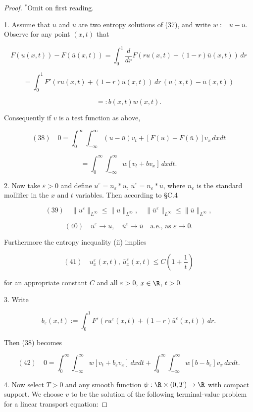 \begin{proof}
$^*$Omit on first reading.

1. Assume that $u$ and $\bar{u}$ are two entropy solutions of (37), and write $w := u - \bar{u}$. Observe for any point $(x,t)$ that

$$F(u(x,t)) - F(\bar{u}(x,t)) = \int_0^1 \frac{d}{dr} F(ru(x,t) + (1-r)\bar{u}(x,t)) \, dr$$

$$= \int_0^1 F'(ru(x,t) + (1-r)\bar{u}(x,t)) \, dr \, (u(x,t) - \bar{u}(x,t))$$

$$=: b(x,t)w(x,t).$$

Consequently if $v$ is a test function as above,

$$(38) \quad 0 = \int_0^\infty \int_{-\infty}^\infty (u - \bar{u})v_t + [F(u) - F(\bar{u})]v_x \, dx dt$$

$$= \int_0^\infty \int_{-\infty}^\infty w[v_t + bv_x] \, dx dt.$$

2. Now take $\varepsilon > 0$ and define $u^\varepsilon = n_\varepsilon * u$, $\bar{u}^\varepsilon = n_\varepsilon * \bar{u}$, where $n_\varepsilon$ is the standard mollifier in the $x$ and $t$ variables. Then according to \S C.4

$$(39) \quad \|u^\varepsilon\|_{L^\infty} \leq \|u\|_{L^\infty}, \quad \|\bar{u}^\varepsilon\|_{L^\infty} \leq \|\bar{u}\|_{L^\infty},$$

$$(40) \quad u^\varepsilon \to u, \quad \bar{u}^\varepsilon \to \bar{u} \quad \text{a.e., as } \varepsilon \to 0.$$

Furthermore the entropy inequality (ii) implies

$$(41) \quad u_x^\varepsilon(x,t), \, \bar{u}_x^\varepsilon(x,t) \leq C\left(1 + \frac{1}{t}\right)$$

for an appropriate constant $C$ and all $\varepsilon > 0$, $x \in \R$, $t > 0$.

3. Write

$$b_\varepsilon(x,t) := \int_0^1 F'(ru^\varepsilon(x,t) + (1-r)\bar{u}^\varepsilon(x,t)) \, dr.$$

Then (38) becomes

$$(42) \quad 0 = \int_0^\infty \int_{-\infty}^\infty w[v_t + b_\varepsilon v_x] \, dx dt + \int_0^\infty \int_{-\infty}^\infty w[b - b_\varepsilon]v_x \, dx dt.$$

4. Now select $T > 0$ and any smooth function $\psi: \R \times (0,T) \to \R$ with compact support. We choose $v$ to be the solution of the following terminal-value problem for a linear transport equation:


\end{proof}
